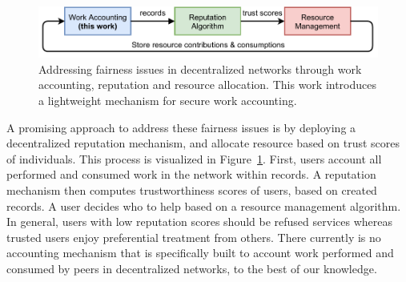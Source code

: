 \begin{figure}[t]
	\centering
	\includegraphics[width=.9\linewidth]{trustchain/assets/trust_cycle}
	\caption{Addressing fairness issues in decentralized networks through work accounting, reputation and resource allocation. This work introduces a lightweight mechanism for secure work accounting.}
	\label{fig:trust_cycle}
\end{figure}

A promising approach to address these fairness issues is by deploying a decentralized reputation mechanism, and allocate resource based on trust scores of individuals.
This process is visualized in Figure~\ref{fig:trust_cycle}.
First, users account all performed and consumed work in the network within records.
A reputation mechanism then computes trustworthiness scores of users, based on created records.
A user decides who to help based on a resource management algorithm.
In general, users with low reputation scores should be refused services whereas trusted users enjoy preferential treatment from others.
There currently is no accounting mechanism that is specifically built to account work performed and consumed by peers in decentralized networks, to the best of our knowledge.



